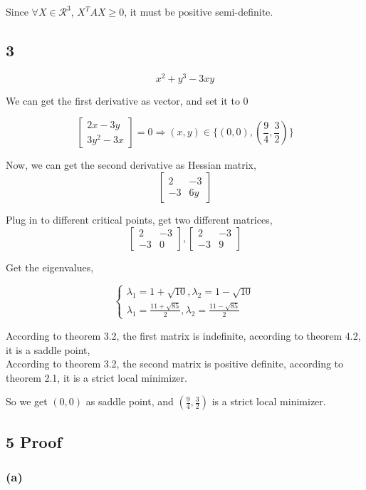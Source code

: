 \documentclass{article}
\def\implies{\Longrightarrow}
\begin{document}
Since $\forall X \in \mathcal{R}^3$, $X^TAX \ge 0$, it must be  positive semi-definite.


\subsection*{3}
$$x^2 + y^3 - 3xy$$

We can get the first derivative as vector, and set it to $0$

$$\begin{bmatrix} 2x - 3y \\ 3y^2 - 3x\end{bmatrix} = 0 \implies (x, y) \in \{(0, 0), (\frac{9}{4}, \frac{3}{2}) \}$$

Now, we can get the second derivative as Hessian matrix,
$$\begin{bmatrix} 2 & -3 \\ -3 & 6y\end{bmatrix} $$

Plug in to different critical points, get two different matrices, 
$$\begin{bmatrix} 2 & -3 \\ -3 & 0\end{bmatrix} , \begin{bmatrix} 2 & -3 \\ -3 & 9\end{bmatrix} $$

Get the eigenvalues,

$$
\begin{cases*}
\lambda_1 = 1+\sqrt{10}, \lambda_2=1-\sqrt{10}\\
\lambda_1=\frac{11+\sqrt{85}}{2}, \lambda_2=\frac{11-\sqrt{85}}{2}
\end{cases*}
$$

According to theorem 3.2, the first matrix is indefinite, according to theorem 4.2, it is a saddle point, \\
According to theorem 3.2, the second matrix is positive definite, according to theorem 2.1, it is a strict local minimizer.

So we get $(0, 0)$ as saddle point, and $ (\frac{9}{4}, \frac{3}{2})$ is a strict local minimizer.

\subsection*{5 Proof}
\subsubsection*{(a)}
\end{document}
